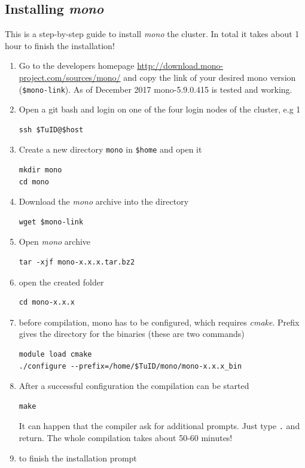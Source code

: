 \documentclass[11pt,twoside,a4paper]{fdyartcl}
\begin{document}
\subsection{Installing \emph{mono}}
\label{sec:mono}
This is a step-by-step guide to install \emph{mono} the cluster. In total it takes about 1 hour to finish the installation!
\begin{enumerate}
\item Go to the developers homepage \url{http://download.mono-project.com/sources/mono/} and copy the link of your desired mono version (\verb|$mono-link|). As of December 2017 mono-5.9.0.415 is tested and working.
\item Open a git bash and login on one of the four login nodes of the cluster, e.g 1
\begin{verbatim}
ssh $TuID@$host
\end{verbatim}
\item Create a new directory \verb|mono| in \verb|$home| and open it
\begin{verbatim}
mkdir mono
cd mono
\end{verbatim}
\item Download the \emph{mono} archive into the directory
\begin{verbatim}
wget $mono-link
\end{verbatim}
\item Open \emph{mono} archive
\begin{verbatim}
tar -xjf mono-x.x.x.tar.bz2
\end{verbatim}
\item open the created folder
\begin{verbatim}
cd mono-x.x.x
\end{verbatim}
\item before compilation, mono has to be configured, which requires \emph{cmake}. Prefix gives the directory for the binaries (these are two commands)
\begin{verbatim}
module load cmake
./configure --prefix=/home/$TuID/mono/mono-x.x.x_bin
\end{verbatim} 
\item After a successful configuration the compilation can be started
\begin{verbatim}
make
\end{verbatim}
It can happen that the compiler ask for additional prompts. Just type \verb|.| and return.
The whole compilation takes about 50-60 minutes!
\item to finish the installation prompt
\begin{verbatim}

\end{verbatim}
\end{enumerate}
\end{document}
